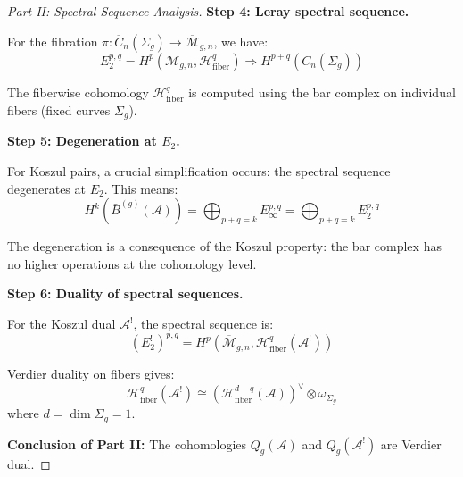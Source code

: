 \begin{proof}[Part II: Spectral Sequence Analysis]

\textbf{Step 4: Leray spectral sequence.}

For the fibration $\pi: \overline{C}_n(\Sigma_g) \to \overline{\mathcal{M}}_{g,n}$, we have:
\begin{equation}
E_2^{p,q} = H^p(\overline{\mathcal{M}}_{g,n}, \mathcal{H}^q_{\text{fiber}}) \Rightarrow H^{p+q}(\overline{C}_n(\Sigma_g))
\end{equation}

The fiberwise cohomology $\mathcal{H}^q_{\text{fiber}}$ is computed using the bar complex on individual fibers (fixed curves $\Sigma_g$).

\textbf{Step 5: Degeneration at $E_2$.}

For Koszul pairs, a crucial simplification occurs: the spectral sequence degenerates at $E_2$. This means:
\begin{equation}
H^k(\bar{B}^{(g)}(\mathcal{A})) = \bigoplus_{p+q=k} E_\infty^{p,q} = \bigoplus_{p+q=k} E_2^{p,q}
\end{equation}

The degeneration is a consequence of the Koszul property: the bar complex has no higher operations at the cohomology level.

\textbf{Step 6: Duality of spectral sequences.}

For the Koszul dual $\mathcal{A}^!$, the spectral sequence is:
\begin{equation}
(E_2^{!})^{p,q} = H^p(\overline{\mathcal{M}}_{g,n}, \mathcal{H}^q_{\text{fiber}}(\mathcal{A}^!))
\end{equation}

Verdier duality on fibers gives:
\begin{equation}
\mathcal{H}^q_{\text{fiber}}(\mathcal{A}^!) \cong (\mathcal{H}^{d-q}_{\text{fiber}}(\mathcal{A}))^\vee \otimes \omega_{\Sigma_g}
\end{equation}
where $d = \dim \Sigma_g = 1$.

\textbf{Conclusion of Part II:} The cohomologies $Q_g(\mathcal{A})$ and $Q_g(\mathcal{A}^!)$ are Verdier dual.
\end{proof}

